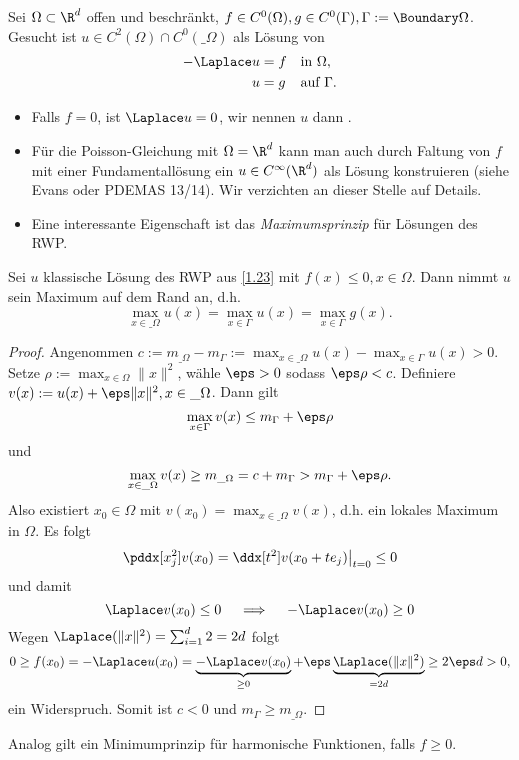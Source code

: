 \begin{df} \label{1.23}
	Sei $\Omega \subset \R^d$ offen und beschränkt, $f \in C^0(\Omega), g \in C^0(\Gamma), \Gamma := \Boundary \Omega$.
	Gesucht ist $u \in C^2(\Omega) \cap C^0(\_\Omega)$ als Lösung von
	\begin{align*}
		- \Laplace u &= f  && \text{in $\Omega$}, \\
		u &= g  && \text{auf $\Gamma$}.
	\end{align*}
	\begin{note}
		\begin{itemize}
			\item
				Falls $f = 0$, ist $\Laplace u = 0$, wir nennen $u$ dann .
			\item
				Für die Poisson-Gleichung mit $\Omega = \R^d$ kann man auch durch Faltung von $f$ mit einer Fundamentallösung ein $u \in C^\infty(\R^d)$ als Lösung konstruieren (siehe Evans oder PDEMAS 13/14).
				Wir verzichten an dieser Stelle auf Details.
			\item
				Eine interessante Eigenschaft ist das \emph{Maximumsprinzip} für Lösungen des RWP.
		\end{itemize}
	\end{note}
\end{df}

\begin{st} \label{1.24}
	Sei $u$ klassische Lösung des RWP aus \ref{1.23} mit $f(x) \le 0, x \in \Omega$.
	Dann nimmt $u$ sein Maximum auf dem Rand an, d.h.
	\[
		\max_{x\in \_\Omega} u(x) = \max_{x \in \Gamma} u(x) = \max_{x\in \Gamma} g(x).
	\]
	\begin{proof}
		Angenommen $c := m_{\_\Omega} - m_{\Gamma} := \max_{x\in \_\Omega} u(x) - \max_{x\in\Gamma} u(x) > 0$.
		Setze $\rho := \max_{x\in\Omega} \|x\|^2$, wähle $\eps > 0$ sodass $\eps \rho < c$.
		Definiere $v(x) := u(x) + \eps \|x\|^2, x \in \_\Omega$.
		Dann gilt
		\[
			\max_{x\in\Gamma} v(x) \le m_\Gamma + \eps \rho
		\]
		und
		\[
			\max_{x\in\_\Omega} v(x) \ge m_{\_\Omega} = c + m_\Gamma > m_\Gamma + \eps \rho.
		\]
		Also existiert $x_0 \in \Omega$ mit $v(x_0) = \max_{x\in \_\Omega} v(x)$, d.h. ein lokales Maximum in $\Omega$.
		Es folgt
		\[
			\pddx[x_j^2] v(x_0)
			= \ddx[t^2] v(x_0 + te_j) \big|_{t=0}
			\le 0
		\]
		und damit
		\[
			\Laplace v(x_0) \le 0
			\quad\implies\quad
			-\Laplace v(x_0) \ge 0
		\]
		Wegen $\Laplace(\|x\|^2) = \sum_{i=1}^d 2 = 2d$ folgt
		\[
			0
			\ge f(x_0)
			= - \Laplace u(x_0)
			= \underbrace{- \Laplace v(x_0)}_{\ge 0} + \eps \underbrace{\Laplace (\|x\|^2)}_{=2d}
			\ge 2\eps d
			> 0,
		\]
		ein Widerspruch.
		Somit ist $c < 0$ und $m_\Gamma \ge m_{\_\Omega}$.
	\end{proof}
	\begin{note}
		Analog gilt ein Minimumprinzip für harmonische Funktionen, falls $f \ge 0$.
	\end{note}
\end{st}

